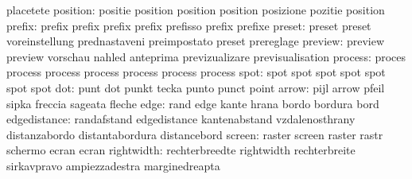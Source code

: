                            placetete
                 position: positie                   position
                           position                  position
                           posizione                 pozitie
                           position %
                   prefix: prefix                    prefix
                           prefix                    prefix
                           prefisso                  prefix
                           prefixe
                   preset: preset                    preset
                           voreinstellung            prednastaveni
                           preimpostato              preset
                           prereglage
                  preview: preview                   preview
                           vorschau                  nahled
                           anteprima                 previzualizare
                           previsualisation
                  process: proces                    process
                           process                   process
                           process                   process
                           process
                     spot: spot                      spot
                           spot                      spot
                           spot                      spot
                           spot
                      dot: punt                      dot
                           punkt                     tecka
                           punto                     punct
                           point
                    arrow: pijl                      arrow
                           pfeil                     sipka
                           freccia                   sageata
                           fleche
                     edge: rand                      edge
                           kante                     hrana
                           bordo                     bordura
                           bord
             edgedistance: randafstand               edgedistance
                           kantenabstand             vzdalenosthrany
                           distanzabordo             distantabordura
                           distancebord
                   screen: raster                    screen
                           raster                    rastr
                           schermo                   ecran
                           ecran
               rightwidth: rechterbreedte            rightwidth
                           rechterbreite             sirkavpravo
                           ampiezzadestra            marginedreapta
